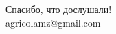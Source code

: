 \section{}
\begin{frame}
{\Large Спасибо, что дослушали!\bigskip\\
agricolamz@gmail.com
\vspace{-130pt}}
\end{frame}

